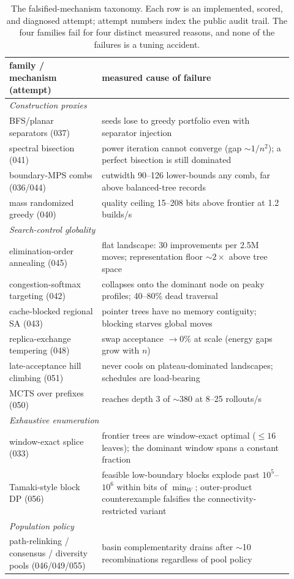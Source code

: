 \documentclass{SciPost}
\begin{document}
\begin{appendix}
\begin{table}[t]
\centering
\footnotesize
\begin{tabular}{p{0.30\linewidth}p{0.62\linewidth}}
\toprule
family / mechanism (attempt) & measured cause of failure \\
\midrule
\multicolumn{2}{l}{\emph{Construction proxies}}\\
BFS/planar separators (037) & seeds lose to greedy portfolio even with separator injection \\
spectral bisection (041) & power iteration cannot converge (gap $\sim 1/n^2$); a perfect bisection is still dominated \\
boundary-MPS combs (036/044) & cutwidth 90--126 lower-bounds any comb, far above balanced-tree records \\
mass randomized greedy (040) & quality ceiling 15--208 bits above frontier at 1.2 builds/s \\
\midrule
\multicolumn{2}{l}{\emph{Search-control globality}}\\
elimination-order annealing (045) & flat landscape: 30 improvements per 2.5M moves; representation floor $\sim\!2\times$ above tree space \\
congestion-softmax targeting (042) & collapses onto the dominant node on peaky profiles; 40--80\% dead traversal \\
cache-blocked regional SA (043) & pointer trees have no memory contiguity; blocking starves global moves \\
replica-exchange tempering (048) & swap acceptance $\to 0\%$ at scale (energy gaps grow with $n$) \\
late-acceptance hill climbing (051) & never cools on plateau-dominated landscapes; schedules are load-bearing \\
MCTS over prefixes (050) & reaches depth 3 of $\sim$380 at 8--25 rollouts/s \\
\midrule
\multicolumn{2}{l}{\emph{Exhaustive enumeration}}\\
window-exact splice (033) & frontier trees are window-exact optimal ($\le 16$ leaves); the dominant window spans a constant fraction \\
Tamaki-style block DP (056) & feasible low-boundary blocks explode past $10^5$--$10^6$ within bits of $\min_W$; outer-product counterexample falsifies the connectivity-restricted variant \\
\midrule
\multicolumn{2}{l}{\emph{Population policy}}\\
path-relinking / consensus / diversity pools (046/049/055) & basin complementarity drains after $\sim$10 recombinations regardless of pool policy \\
\bottomrule
\end{tabular}
\caption{The falsified-mechanism taxonomy. Each row is an implemented,
scored, and diagnosed attempt; attempt numbers index the public audit
trail. The four families fail for four distinct measured reasons, and
none of the failures is a tuning accident.}
\label{tab:taxonomy}
\end{table}


\end{appendix}
\end{document}
